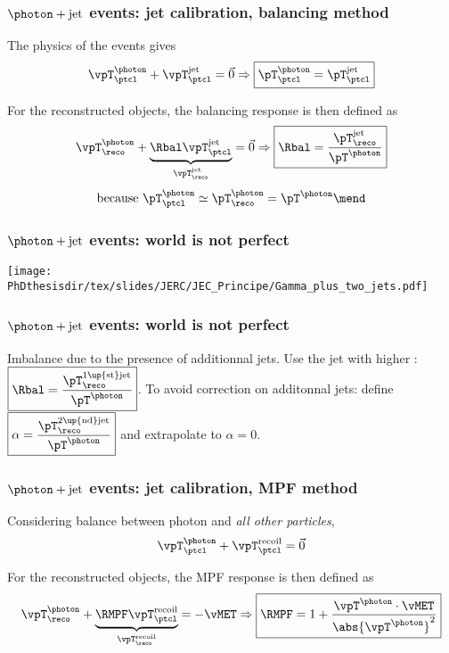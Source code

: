 \begin{frame}
\frametitle{$\photon+\text{jet}$ events: jet calibration, balancing method}
\manip The physics of the events gives
\begin{equation*}
\vpT^\photon_\ptcl + \vpT^\text{jet}_\ptcl = \vec{0} \Rightarrow \boxed{{\pT}^\photon_\ptcl = {\pT}^\text{jet}_\ptcl}
\end{equation*}

\pause
\vfill

\manip For the reconstructed objects, the balancing response is then defined as
\begin{equation*}
\vpT^\photon_\reco + \underbrace{\Rbal \vpT^\text{jet}_\ptcl}_{\vpT^\text{jet}_\reco} = \vec{0}
\Rightarrow
\boxed{\Rbal = \frac{{\pT}^\text{jet}_\reco}{\pT^\photon}}
\end{equation*}
\begin{equation*}
\text{because }
\pT^\photon_\ptcl\simeq\pT^\photon_\reco
=\pT^\photon
\mend
\end{equation*}
\end{frame}

\begin{frame}
\frametitle{$\photon+\text{jet}$ events: world is not perfect}
\begin{center}
\texttt{[image: \\PhDthesisdir/tex/slides/JERC/JEC\_Principe/Gamma\_plus\_two\_jets.pdf]}
\end{center}
\end{frame}

\begin{frame}
\frametitle{$\photon+\text{jet}$ events: world is not perfect}
\manip Imbalance due to the presence of additionnal jets.
\pause
\manip Use the jet with higher \pT: $\displaystyle \boxed{\Rbal = \frac{{\pT}^\text{1\up{st}jet}_\reco}{\pT^\photon}}$.
\pause
\manip To avoid correction on additonnal jets: define $\displaystyle \boxed{\alpha = \frac{{\pT}^\text{2\up{nd}jet}_\reco}{\pT^\photon}}$ and extrapolate to $\alpha=0$.
\end{frame}

\begin{frame}
\frametitle{$\photon+\text{jet}$ events: jet calibration, MPF method}
\manip Considering balance between photon and \emph{all other particles},
\begin{equation*}
\vpT^\photon_\ptcl + \vpT^\text{recoil}_\ptcl = \vec{0}
\end{equation*}

\pause
\vfill

\manip For the reconstructed objects, the MPF response is then defined as
\begin{equation*}
\vpT^\photon_\reco + \underbrace{\RMPF \vpT^\text{recoil}_\ptcl}_{\vpT^\text{recoil}_\reco} = -\vMET
\Rightarrow
\boxed{\RMPF = 1 + \frac{\vpT^\photon\cdot\vMET}{\abs{\vpT^\photon}^2}}
\end{equation*}
\end{frame}